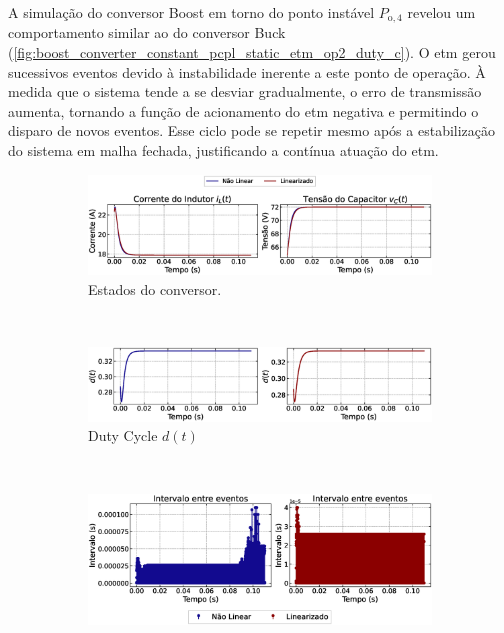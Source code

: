 A simulação do conversor Boost em torno do ponto instável $P_{\mathrm{o}, 4}$ revelou um comportamento similar ao do conversor Buck (\autoref{fig:boost_converter_constant_pcpl_static_etm_op2_duty_c}). O \acrshort{etm} gerou sucessivos eventos devido à instabilidade inerente a este ponto de operação. À medida que o sistema tende a se desviar gradualmente, o erro de transmissão aumenta, tornando a função de acionamento do \acrshort{etm}  negativa e permitindo o disparo de novos eventos. Esse ciclo pode se repetir mesmo após a estabilização do sistema em malha fechada, justificando a contínua atuação do \acrshort{etm}.

\begin{figure}[H]
  \centering
  \captionsetup{justification=centering}
  \begin{subfigure}{1.\textwidth}
    \centering
    \includegraphics[width=1.\textwidth]{figuras/static-etm/boost/sim1/op2/result.eps}
    \caption{Estados do conversor.}
    \label{fig:boost_converter_constant_pcpl_static_etm_op2_duty_a}
  \end{subfigure}
  \\[6pt]
  \begin{subfigure}{1.\textwidth}
    \centering
    \includegraphics[width=1.\textwidth]{figuras/static-etm/boost/sim1/op2/duty-cycle.eps}
    \caption{Duty Cycle $d(t)$}
    \label{fig:boost_converter_constant_pcpl_static_etm_op2_duty_b}
  \end{subfigure}
  \\[6pt]
  \begin{subfigure}{1.\textwidth}
    \centering
    \includegraphics[width=1.\textwidth]{figuras/static-etm/boost/sim1/op2/inter-event-times.eps}

\end{subfigure}
\end{figure}
